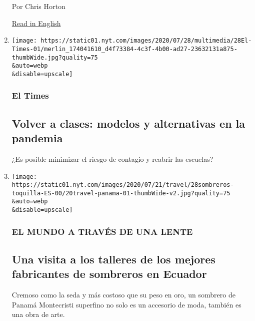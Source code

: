 \begin{enumerate}
  Por Chris Horton

  \href{https://www.nytimes.com/2020/07/24/world/asia/taiwan-octogenarian-couple-instagram-laundry.html}{Read
  in English}
\item
  \href{/es/2020/07/28/espanol/regreso-a-clases-covid.html}{}

  \texttt{[image: https://static01.nyt.com/images/2020/07/28/multimedia/28El-Times-01/merlin\_174041610\_d4f73384-4c3f-4b00-ad27-23632131a875-thumbWide.jpg?quality=75\\\&auto=webp\\\&disable=upscale]}

  \hypertarget{el-times}{%
  \subsubsection{El Times}\label{el-times}}

  \hypertarget{volver-a-clases-modelos-y-alternativas-en-la-pandemia}{%
  \subsection{Volver a clases: modelos y alternativas en la
  pandemia}\label{volver-a-clases-modelos-y-alternativas-en-la-pandemia}}

  ¿Es posible minimizar el riesgo de contagio y reabrir las escuelas?
\item
  \href{/es/2020/07/28/espanol/estilos-de-vida/sombreros-toquilla-panama-ecuador.html}{}

  \texttt{[image: https://static01.nyt.com/images/2020/07/21/travel/28sombreros-toquilla-ES-00/20travel-panama-01-thumbWide-v2.jpg?quality=75\\\&auto=webp\\\&disable=upscale]}

  \hypertarget{el-mundo-a-travuxe9s-de-una-lente}{%
  \subsubsection{EL MUNDO A TRAVÉS DE UNA
  LENTE}\label{el-mundo-a-travuxe9s-de-una-lente}}

  \hypertarget{una-visita-a-los-talleres-de-los-mejores-fabricantes-de-sombreros-en-ecuador}{%
  \subsection{Una visita a los talleres de los mejores fabricantes de
  sombreros en
  Ecuador}\label{una-visita-a-los-talleres-de-los-mejores-fabricantes-de-sombreros-en-ecuador}}

  Cremoso como la seda y más costoso que su peso en oro, un sombrero de
  Panamá Montecristi superfino no solo es un accesorio de moda, también
  es una obra de arte.


\end{enumerate}
